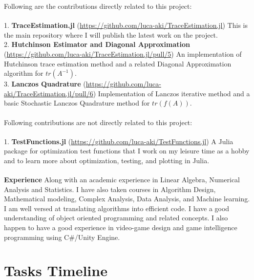 \documentclass[12]{article}
\begin{document}
Following are the contributions directly related to this project:\\~\\     
1. \textbf{TraceEstimation.jl} (\url{https://github.com/luca-aki/TraceEstimation.jl}) This is the main repository where I will publish the latest work on the project.\\
2. \textbf{Hutchinson Estimator and Diagonal Approximation} (\url{https://github.com/luca-aki/TraceEstimation.jl/pull/5}) An implementation of Hutchinson trace estimation method and a related Diagonal Approximation algorithm for $tr(A^{-1})$.\\
3. \textbf{Lanczos Quadrature} (\url{https://github.com/luca-aki/TraceEstimation.jl/pull/6}) Implementation of Lanczos iterative method and a basic Stochastic Lanczos Quadrature method for $tr(f(A))$.\\~\\
Following contributions are not directly related to this project:\\~\\
1. \textbf{TestFunctions.jl} (\url{https://github.com/luca-aki/TestFunctions.jl}) A Julia package for optimization test functions that I work on my leisure time as a hobby and to learn more about optimization, testing, and plotting in Julia.\\~\\
\textbf{Experience} Along with an academic experience in Linear Algebra, Numerical Analysis and Statistics. I have also taken courses in Algorithm Design, Mathematical modeling, Complex Analysis, Data Analysis, and Machine learning. I am well versed at translating algorithms into efficient code. I have a good understanding of object oriented programming and related concepts. I also happen to have a good experience in video-game design and game intelligence programming using {C\#/Unity Engine}.      


\section{Tasks Timeline}               
\end{document}
